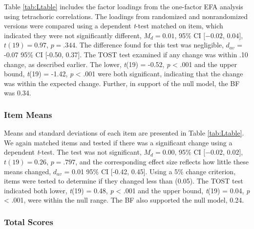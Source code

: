 \documentclass[english,man, mask]{apa6}
\theoremstyle{definition}
\theoremstyle{definition}
\theoremstyle{definition}
\theoremstyle{remark}
\begin{document}
Table \ref{tab:Ltable} includes the factor loadings from the one-factor
EFA analysis using tetrachoric correlations. The loadings from
randomized and nonrandomized versions were compared using a dependent
\emph{t}-test matched on item, which indicated they were not
significantly different, \(M_d = 0.01\), 95\% CI \([-0.02\), \(0.04]\),
\(t(19) = 0.97\), \(p = .344\). The difference found for this test was
negligible, \(d_{av}\) = -0.07 95\% CI {[}-0.50, 0.37{]}. The TOST test
examined if any change was within .10 change, as described earlier. The
lower, \emph{t}(19) = -0.52, \emph{p} \textless{} .001 and the upper
bound, \emph{t}(19) = -1.42, \emph{p} \textless{} .001 were both
significant, indicating that the change was within the expected change.
Further, in support of the null model, the BF was 0.34.

\subsubsection{Item Means}\label{item-means-1}

Means and standard deviations of each item are presented in Table
\ref{tab:Ltable}. We again matched items and tested if there was a
significant change using a dependent \emph{t}-test. The test was not
significant, \(M_d = 0.00\), 95\% CI \([-0.02\), \(0.02]\),
\(t(19) = 0.26\), \(p = .797\), and the corresponding effect size
reflects how little these means changed, \(d_{av}\) = 0.01 95\% CI
{[}-0.42, 0.45{]}. Using a 5\% change criterion, items were tested to
determine if they changed less than (0.05). The TOST test indicated both
lower, \emph{t}(19) = 0.48, \emph{p} \textless{} .001 and the upper
bound, \emph{t}(19) = 0.04, \emph{p} \textless{} .001, were within the
null range. The BF also supported the null model, 0.24.

\subsubsection{Total Scores}\label{total-scores-1}
\end{document}

